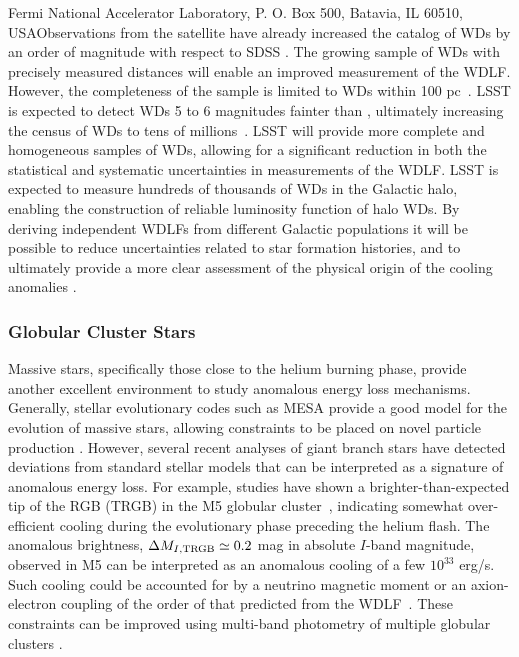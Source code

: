 Fermi National Accelerator Laboratory, P. O. Box 500, Batavia, IL 60510, USAObservations from the \Gaia satellite have already increased the catalog of WDs by an order of magnitude with respect to SDSS \citep{1805.01227,1807.03315,1807.02559}.
The growing sample of WDs with precisely measured distances will enable an improved measurement of the WDLF.  
However, the completeness of the \Gaia sample is limited to WDs within 100 pc~\citep{1807.03315}.
LSST is expected to detect WDs 5 to 6 magnitudes fainter than \Gaia, ultimately increasing the census of WDs to tens of millions~\citep{0912.0201}.
LSST will provide more complete and homogeneous samples of WDs, allowing for a significant reduction in both the statistical and systematic uncertainties in measurements of the WDLF. 
LSST is expected to measure hundreds of thousands of WDs in the Galactic halo, enabling the construction of reliable luminosity function of halo WDs. 
By deriving independent WDLFs from different Galactic populations it will be possible to reduce uncertainties related to star formation histories, and to ultimately provide a more clear assessment of the physical origin of the cooling anomalies \citep{Isern:2018uce}. 


\subsubsection{Globular Cluster Stars}


Massive stars, specifically those close to the helium burning phase, provide another excellent environment to study anomalous energy loss mechanisms. 
Generally, stellar evolutionary codes such as MESA \citep{1009.1622} provide a good model for the evolution of massive stars, allowing constraints to be placed on novel particle production \citep[\eg,][]{1210.1271,1611.05852}.
However, several recent analyses of giant branch stars have detected deviations from standard stellar models that can be interpreted as a signature of anomalous energy loss.
For example, studies have shown a brighter-than-expected tip of the RGB (TRGB) in the M5 globular cluster~\citep{Viaux:2013lha,Viaux:2013hca}, indicating somewhat over-efficient cooling during the evolutionary phase preceding the helium flash.
The anomalous brightness, $\Delta M_{I,{\rm TRGB}}\simeq 0.2$ mag in absolute $I$-band magnitude, observed in M5  can be interpreted as an anomalous cooling of a few $10^{33}$ erg/s.
Such cooling could be accounted for by a neutrino magnetic moment or an axion-electron coupling of the order of that predicted from the WDLF~\citep{Viaux:2013lha}. 
These constraints can be improved using multi-band photometry of multiple globular clusters \citep[\eg,][]{Straniero:2018fbv}.

